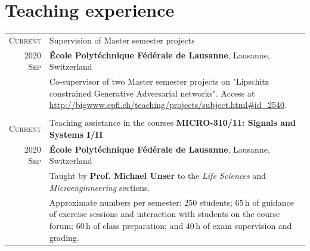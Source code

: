 \documentclass[a4paper,10pt]{article}
\begin{document}

  \vspace{15pt}

  \section{Teaching experience}

    \begin{tabular}{r|p{13cm}}

      \textsc{Current}	 & Supervision of Master semester projects \\
      \textsc{2020 Sep}  & \footnotesize{\textbf{École Polytéchnique Fédérale de Lausanne}, Lausanne, Switzerland} \\
      & \footnotesize{Co-supervisor of two Master semester projects on "Lipschitz constrained Generative Adversarial networks". Access at \url{http://bigwww.epfl.ch/teaching/projects/subject.html#id_2540}.} \\
      \multicolumn{2}{c}{} \\

	  \textsc{Current}     & Teaching assistance in the courses \textbf{MICRO-310/11: Signals and Systems I/II} \\
	  \textsc{2020 Sep} & \footnotesize{\textbf{École Polytéchnique Fédérale de Lausanne}, Lausanne, Switzerland} \\
    & \footnotesize{Taught by \textbf{Prof. Michael Unser} to the \emph{Life Sciences} and \emph{Microenginneering} sections.} \\
    & \footnotesize{Approximate numbers per semester:
              $250$ students;
              $65\,\mathrm{h}$ of guidance of exercise sessions and interaction with students on the course forum;
              $60\,\mathrm{h}$ of class preparation; and
							$40\,\mathrm{h}$ of exam supervision and grading.
              } \\

    \end{tabular}


  \vspace{15pt}
\end{document}

